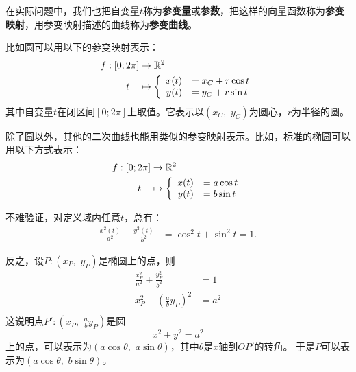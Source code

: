 \documentclass[12pt,UTF8]{ctexbook}
\theoremstyle{definition}
\theoremstyle{plain}
\begin{document}
在实际问题中，我们也把自变量$t$称为\textbf{参变量}或\textbf{参数}，把这样的向量函数称为\textbf{参变映射}，用参变映射描述的曲线称为\textbf{参变曲线}。

比如圆可以用以下的参变映射表示：
\begin{align*}
    f: [0;2\pi] &\rightarrow \mathbb{R}^2 \\
    t\quad &\mapsto\left\{
        \begin{array}[]{rl}
            x(t) &= x_C + r\cos{t} \\
            y(t) &= y_C + r\sin{t} \\
        \end{array}
    \right.
\end{align*}
其中自变量$t$在闭区间$[0;2\pi]$上取值。它表示以$(x_C,\,\, y_C)$为圆心，$r$为半径的圆。

除了圆以外，其他的二次曲线也能用类似的参变映射表示。比如，标准的椭圆可以用以下方式表示：
\begin{align*}
    f: [0;2\pi] &\rightarrow \mathbb{R}^2 \\
    t\quad &\mapsto\left\{
        \begin{array}[]{rl}
            x(t) &= a\cos{t} \\
            y(t) &= b\sin{t} \\
        \end{array}
    \right.
\end{align*}

不难验证，对定义域内任意$t$，总有：
\begin{align*}
    \frac{x^2(t)}{a^2} + \frac{y^2(t)}{b^2} &= \cos^2{t} + \sin^2{t} = 1.
\end{align*}

反之，设$P:(x_P,\,\,y_P)$是椭圆上的点，则
\begin{align*}
    \frac{x_P^2}{a^2} + \frac{y_P^2}{b^2} &= 1\\
   x_P^2 + \left(\frac{a}{b}y_P\right)^2 & = a^2 \\
\end{align*}
这说明点$\displaystyle P': \left(x_P,\,\,\frac{a}{b}y_P\right)$是圆
$$ x^2 + y^2 = a^2$$
上的点，可以表示为$(a\cos{\theta},\,\,a\sin{\theta})$，其中$\theta$是$x$轴到$OP'$的转角。
于是$P$可以表示为$(a\cos{\theta},\,\,b\sin{\theta})$。
\end{document}
